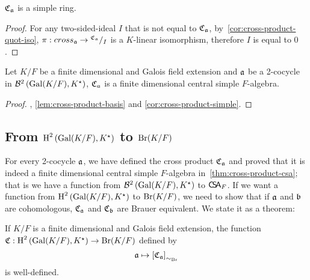 \begin{corollary}\label{cor:cross-product-simple}
  $\operatorname{\mathfrak{C}}_{\mathfrak{a}}$ is a simple ring.
  \leanok
\end{corollary}

\begin{proof}
  For any two-sided-ideal $I$ that is not equal to $\operatorname{\mathfrak{C}}_{\mathfrak{a}}$, by~\cref{cor:cross-product-quot-iso}, $\pi : cross_{\mathfrak{a}} \to {}^{\operatorname{\mathfrak{C}}_{\mathfrak{a}}}/_{I}$ is a $K$-linear isomorphism, therefore $I$ is equal to $0$.
\end{proof}

\begin{theorem}\label{thm:cross-product-csa}
  Let $K/F$ be a finite dimensional and Galois field extension and $\mathfrak{a}$ be a 2-cocycle in $\mathcal{B}^{2}\left(\operatorname{Gal}(K/F), K^{\star}\right)$, $\operatorname{\mathfrak{C}}_{a}$ is a finite dimensional central simple $F$-algebra.
  \leanok
\end{theorem}
\begin{proof}
  , \cref{lem:cross-product-basis} and \cref{cor:cross-product-simple}.
\end{proof}

\subsection{From $\operatorname{H}^{2}\left(\operatorname{Gal}(K/F), K^{\star}\right)$ to $\operatorname{Br}(K/F)$}

For every 2-cocycle $\mathfrak{a}$, we have defined the cross product $\operatorname{\mathfrak{C}}_{\mathfrak{a}}$ and proved that it is indeed a finite dimensional central simple $F$-algebra in~\cref{thm:cross-product-csa}; that is we have a function from $\mathcal{B}^{2}\left(\operatorname{Gal}(K/F), K^{\star}\right)$ to $\operatorname{\mathsf{C}\!\mathsf{S}\!\mathsf{A}}_{F}$. If we want a function from $\operatorname{H}^{2}\left(\operatorname{Gal}(K/F), K^{\star}\right)$ to $\operatorname{Br}(K/F)$, we need to show that if $\mathfrak{a}$ and $\mathfrak{b}$ are cohomologous, $\operatorname{\mathfrak{C}}_{\mathfrak{a}}$ and $\operatorname{\mathfrak{C}}_{\mathfrak{b}}$ are Brauer equivalent. We state it as a theorem:

\begin{theorem}
  If $K/F$ is a finite dimensional and Galois field extension,
  the function $\operatorname{\mathfrak{C}} : \operatorname{H}^{2}\left(\operatorname{Gal}(K/F), K^{\star}\right) \to \operatorname{Br}(K/F)$ defined by
  \[
    \mathfrak{a} \mapsto \left[\operatorname{\mathfrak{C}}_{\mathfrak{a}}\right]_{\sim_{\operatorname{Br}}}
  \]
  is well-defined.
\end{theorem}

